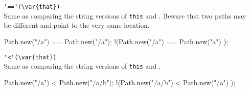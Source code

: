 \begin{urbiscriptapi}
\item \lstinline|'=='(\var{that})|\\
  Same as comparing the string versions of \lstinline|this| and
  .  Beware that two paths may be different and point to the
  very same location.
\begin{urbiassert}
  Path.new("/a")  == Path.new("/a");
!(Path.new("/a")  == Path.new("a")  );
\end{urbiassert}

\item \lstinline|'<'(\var{that})|\\
  Same as comparing the string versions of \lstinline|this| and
  .
\begin{urbiassert}
  Path.new("/a")   < Path.new("/a/b");
!(Path.new("/a/b") < Path.new("/a")  );
\end{urbiassert}

\end{urbiscriptapi}


